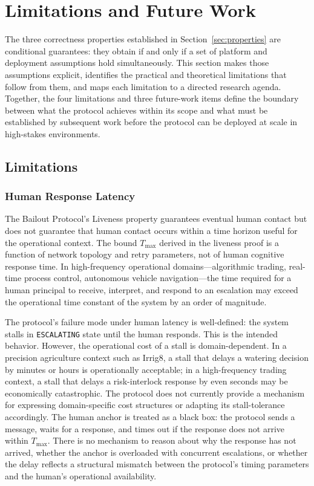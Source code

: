 \section{Limitations and Future Work}\label{sec:limitations}

The three correctness properties established in Section~\ref{sec:properties} are conditional guarantees: they obtain if and only if a set of platform and deployment assumptions hold simultaneously. This section makes those assumptions explicit, identifies the practical and theoretical limitations that follow from them, and maps each limitation to a directed research agenda. Together, the four limitations and three future-work items define the boundary between what the protocol achieves within its scope and what must be established by subsequent work before the protocol can be deployed at scale in high-stakes environments.

\subsection{Limitations}

\subsubsection{Human Response Latency}

The Bailout Protocol's Liveness property guarantees eventual human contact but does not guarantee that human contact occurs within a time horizon useful for the operational context. The bound $T_{\max}$ derived in the liveness proof is a function of network topology and retry parameters, not of human cognitive response time. In high-frequency operational domains---algorithmic trading, real-time process control, autonomous vehicle navigation---the time required for a human principal to receive, interpret, and respond to an escalation may exceed the operational time constant of the system by an order of magnitude.

The protocol's failure mode under human latency is well-defined: the system stalls in \texttt{ESCALATING} state until the human responds. This is the intended behavior. However, the operational cost of a stall is domain-dependent. In a precision agriculture context such as Irrig8, a stall that delays a watering decision by minutes or hours is operationally acceptable; in a high-frequency trading context, a stall that delays a risk-interlock response by even seconds may be economically catastrophic. The protocol does not currently provide a mechanism for expressing domain-specific cost structures or adapting its stall-tolerance accordingly. The human anchor is treated as a black box: the protocol sends a message, waits for a response, and times out if the response does not arrive within $T_{\text{max}}$. There is no mechanism to reason about why the response has not arrived, whether the anchor is overloaded with concurrent escalations, or whether the delay reflects a structural mismatch between the protocol's timing parameters and the human's operational availability.

